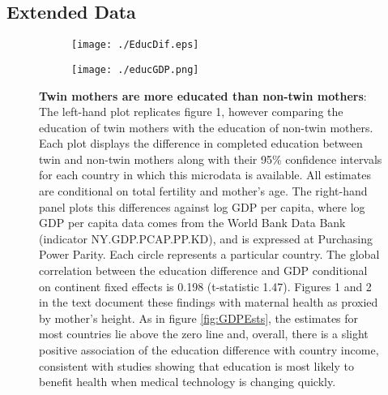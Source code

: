 \documentclass{nature}
\begin{document}
\begin{linenumbers}
\clearpage
\setcounter{figure}{0}
\setcounter{table}{0}
\renewcommand{\tablename}{Extended Data Table}
\renewcommand{\figurename}{Extended Data Figure}
\section{Extended Data}
\begin{spacing}{1}

\begin{figure}[htpb!]
\begin{subfigure}{.5\textwidth}
  \texttt{[image: ./EducDif.eps]}
\end{subfigure}%
\begin{subfigure}{.5\textwidth}
  \texttt{[image: ./educGDP.png]}
\end{subfigure}%
\vspace{5mm}
\caption{\textbf{Twin mothers are more educated than non-twin mothers}: {\footnotesize The left-hand plot replicates figure 1, however comparing the education of twin mothers with the education of non-twin mothers.  Each plot displays the difference in completed education between twin and non-twin mothers along with their 95\% confidence intervals for each country in which this microdata is available.  All estimates are conditional on total fertility and mother's age.  The right-hand panel plots this differences against log GDP per capita, where log GDP per capita data comes from the World Bank Data Bank (indicator NY.GDP.PCAP.PP.KD), and is expressed at Purchasing Power Parity.  Each circle represents a particular country. The global correlation between the education difference and GDP conditional on continent fixed effects is 0.198 (t-statistic 1.47). Figures 1 and 2 in the text document these findings with maternal health as proxied by mother's height. As in figure \ref{fig:GDPEsts}, the estimates for most countries lie above the zero line and, overall, there is a slight positive association of the education difference with country income, consistent with studies showing that education is most likely to benefit health when medical technology is changing quickly\cite{LlerasMuneyGlied2008}.}}
\label{fig:educAll}
\end{figure}


\end{spacing}
\end{linenumbers}
\end{document}
